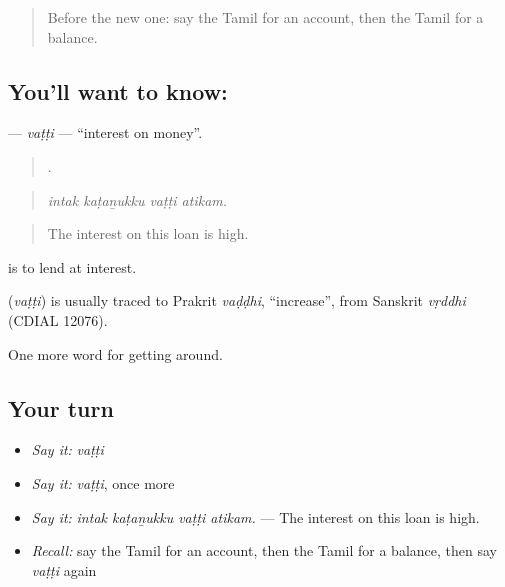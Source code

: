 \label{lesson:TA-C446-vatti}



\begin{quote}
Before the new one: say the Tamil for an account, then the Tamil for a balance.
\end{quote}

\subsection*{You'll want to know: }
\textbf{} — \emph{vaṭṭi} — \textquotedblleft{}interest on money\textquotedblright{}.

\begin{quote}
   .
\end{quote}

\begin{quote}
\emph{intak kaṭaṉukku vaṭṭi atikam.}
\end{quote}

\begin{quote}
The interest on this loan is high.
\end{quote}

  is to lend at interest.

\begin{cousinweb}
\textbf{} (\emph{vaṭṭi}) is usually traced to Prakrit \emph{vaḍḍhi}, \textquotedblleft{}increase\textquotedblright{}, from Sanskrit \emph{vṛddhi} (CDIAL 12076).
\end{cousinweb}

\begin{grammarlens}[title={What you've built}]
One more word for getting around.
\end{grammarlens}

\subsection*{Your turn}
\begin{itemize}
\raggedright
  \item \emph{Say it:} \emph{vaṭṭi}
  \item \emph{Say it:} \emph{vaṭṭi}, once more
  \item \emph{Say it:} \emph{intak kaṭaṉukku vaṭṭi atikam.} — The interest on this loan is high.
  \item \emph{Recall:} say the Tamil for an account, then the Tamil for a balance, then say \emph{vaṭṭi} again
\end{itemize}

